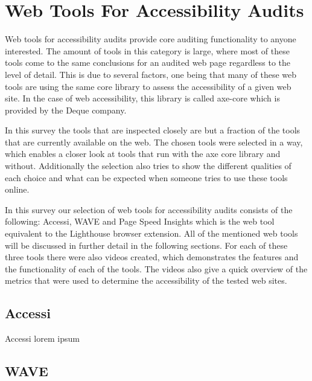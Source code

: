 %
%
% 
% 
% 


\chapter{Web Tools For Accessibility Audits}

\label{chap:WebTools}



Web tools for accessibility audits provide core auditing functionality to anyone interested. The amount of tools in this category is large, where most of these tools come to the same conclusions for an audited web page regardless to the level of detail. This is due to several factors, one being that many of these web tools are using the same core library to assess the accessibility of a given web site. In the case of web accessibility, this library is called axe-core which is provided by the Deque company.

In this survey the tools that are inspected closely are but a fraction of the tools that are currently available on the web. The chosen tools were selected in a way, which enables a closer look at tools that run with the axe core library and without. Additionally the selection also tries to show the different qualities of each choice and what can be expected when someone tries to use these tools online.

In this survey our selection of web tools for accessibility audits consists of the following: Accessi, WAVE and Page Speed Insights which is the web tool equivalent to the Lighthouse browser extension. All of the mentioned web tools will be discussed in further detail in the following sections. For each of these three tools there were also videos created, which demonstrates the features and the functionality of each of the tools. The videos also give a quick overview of the metrics that were used to determine the accessibility of the tested web sites. 

\section{Accessi}

Accessi \parencite{Accessi}
lorem ipsum


\section{WAVE}

